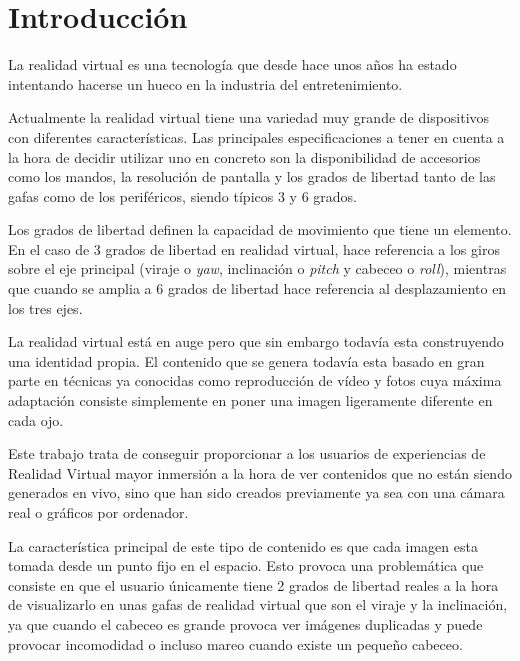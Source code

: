 
\pagestyle{empty}
\chapter{Introducción}
La realidad virtual es una tecnología que desde hace unos años ha estado intentando hacerse un hueco en la industria del entretenimiento.

Actualmente la realidad virtual tiene una variedad muy grande de dispositivos  con diferentes características. Las principales especificaciones a tener en cuenta a la hora de decidir utilizar uno en concreto son la disponibilidad de accesorios como los mandos, la resolución de pantalla y los grados de libertad tanto de las gafas como de los periféricos, siendo típicos 3 y 6 grados.

Los grados de libertad definen la capacidad de movimiento que tiene un elemento. En el caso de 3 grados de libertad en realidad virtual, hace referencia a los giros sobre el eje principal (viraje o \textit{yaw}, inclinación o \textit{pitch} y cabeceo o \textit{roll}), mientras que cuando se amplia a 6 grados de libertad hace referencia al desplazamiento en los tres ejes.

La realidad virtual está en auge pero que sin embargo todavía esta construyendo una identidad propia. El contenido que se genera todavía esta basado en gran parte en técnicas ya conocidas como reproducción de vídeo y fotos cuya máxima adaptación consiste simplemente en poner una imagen ligeramente diferente en cada ojo.

Este trabajo trata de conseguir proporcionar a los usuarios de experiencias de Realidad Virtual mayor inmersión a la hora de ver contenidos que no están siendo generados en vivo, sino que han sido creados previamente ya sea con una cámara real o gráficos por ordenador.

La característica principal de este tipo de contenido es que cada imagen esta tomada desde un punto fijo en el espacio. Esto provoca una problemática que consiste en que el usuario únicamente tiene 2 grados de libertad reales a la hora de visualizarlo en unas gafas de realidad virtual que son el viraje y la inclinación, ya que cuando el cabeceo es grande provoca ver imágenes duplicadas y puede provocar incomodidad o incluso mareo cuando existe un pequeño cabeceo.


